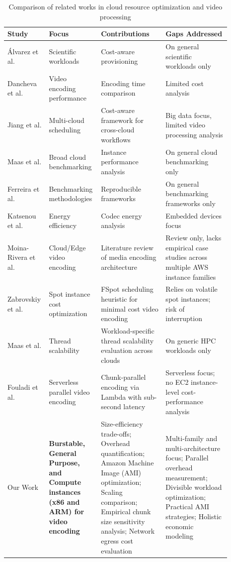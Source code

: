 \documentclass[conference]{IEEEtran}
\begin{document}
\begin{table}[!htbp]
	\centering
	\caption{Comparison of related works in cloud resource optimization and video processing}
	\label{tab:comparative_analysis}
	\begin{tabular}{|p{0.15\linewidth}|p{0.18\linewidth}|p{0.28\linewidth}|p{0.28\linewidth}|}
		\hline
		\textbf{Study} & \textbf{Focus} & \textbf{Contributions} & \textbf{Gaps Addressed} \\
		\hline
		Álvarez et al. \cite{b2} & Scientific workloads & Cost-aware provisioning & On general scientific workloads only \\
		\hline
		Dancheva et al. \cite{b3} & Video encoding performance & Encoding time comparison & Limited cost analysis \\
		\hline
		Jiang et al. \cite{b20} & Multi-cloud scheduling & Cost-aware framework for cross-cloud workflows & Big data focus, limited video processing analysis \\
		\hline
		Maas et al. \cite{b1} & Broad cloud benchmarking & Instance performance analysis & On general cloud benchmarking only \\
		\hline
		Ferreira et al. \cite{b9} & Benchmarking methodologies & Reproducible frameworks & On general benchmarking frameworks only \\
		\hline
		Katsenou et al. \cite{b8} & Energy efficiency & Codec energy analysis & Embedded devices focus \\
		\hline
		Moina-Rivera et al. \cite{b22} & Cloud/Edge video encoding & Literature review of media encoding architecture & Review only, lacks empirical case studies across multiple AWS instance families \\
		\hline
		Zabrovskiy et al. \cite{b21} & Spot instance cost optimization & FSpot scheduling heuristic for minimal cost video encoding & Relies on volatile spot instances; risk of interruption \\
		\hline
		Maas et al. \cite{b23} & Thread scalability & Workload-specific thread scalability evaluation across clouds & On generic HPC workloads only \\
		\hline
		Fouladi et al. \cite{excamera} & Serverless parallel video encoding & Chunk-parallel encoding via Lambda with sub-second latency & Serverless focus; no EC2 instance-level cost-performance analysis \\
		\hline
		Our Work & \textbf{Burstable, General Purpose, and Compute instances (x86 and ARM) for video encoding} & Size-efficiency trade-offs; Overhead quantification; Amazon Machine Image (AMI) optimization; Scaling comparison; Empirical chunk size sensitivity analysis; Network egress cost evaluation & Multi-family and multi-architecture focus; Parallel overhead measurement; Divisible workload optimization; Practical AMI strategies; Holistic economic modeling \\
		\hline
	\end{tabular}
\end{table}
\end{document}
